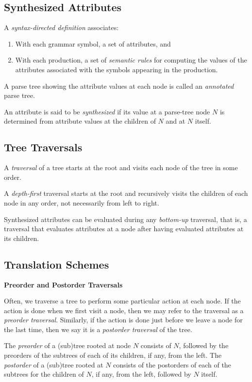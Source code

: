 \documentclass[a4paper,twoside]{book}
\begin{document}
\subsection{Synthesized Attributes}

A \textit{syntax-directed definition} associates:
\begin{enumerate}
    \item With each grammar symbol, a set of attributes, and
    \item With each production, a set of \textit{semantic rules} for computing the values of the attributes associated with the symbols appearing in the production.
\end{enumerate}

A parse tree showing the attribute values at each node is called an \textit{annotated} parse tree.

An attribute is said to be \textit{synthesized} if its value at a parse-tree node $N$ is determined from attribute values at the children of $N$ and at $N$ itself.

\subsection{Tree Traversals}

A \textit{traversal} of a tree starts at the root and visits each node of the tree in some order.

A \textit{depth-first} traversal starts at the root and recursively visits the children of each node in any order, not necessarily from left to right.

Synthesized attributes can be evaluated during any \textit{bottom-up} traversal, that is, a traversal that evaluates attributes at a node after having evaluated attributes at its children.

\subsection{Translation Schemes}

\begin{framed}
    \begin{center}
        \textbf{{\large Preorder and Postorder Traversals}}
    \end{center}

    Often, we traverse a tree to perform some particular action at each node. If the action is done when we first visit a node, then we may refer to the traversal as a \textit{preorder traversal}. Similarly, if the action is done just before we leave a node for the last time, then we say it is a \textit{postorder traversal} of the tree.

    The \textit{preorder} of a (sub)tree rooted at node $N$ consists of $N$, followed by the preorders of the subtrees of each of its children, if any, from the left. The \textit{postorder} of a (sub)tree rooted at $N$ consists of the postorders of each of the subtrees for the children of $N$, if any, from the left, followed by $N$ itself.
\end{framed}
\end{document}
